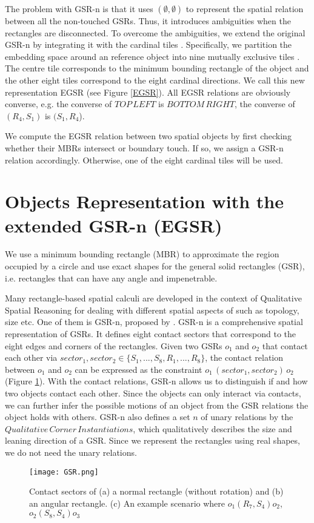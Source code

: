 \documentclass[letterpaper]{article}
\begin{document}
The problem with GSR-n is that it uses $(\emptyset, \emptyset)$ to represent the spatial relation between all the non-touched GSRs. Thus, it introduces ambiguities when the rectangles are disconnected. To overcome the ambiguities, we extend the original GSR-n by integrating it with the cardinal tiles \cite{goyal1997direction}. Specifically, we partition the embedding space around an reference object into nine mutually exclusive tiles . The centre tile corresponds to the minimum bounding rectangle of the object and the other eight tiles correspond to the eight cardinal directions. We call this new representation EGSR (see Figure \ref{EGSR}). All EGSR relations are obviously converse, e.g. the converse of $TOP\,LEFT$ is $BOTTOM\,RIGHT$, the converse of $(R_4, S_1)$ is $(S_1,R_4$).

We compute the EGSR relation between two spatial objects by first checking whether their MBRs intersect or boundary touch. If so, we assign a GSR-n relation accordingly. Otherwise, one of the eight cardinal tiles will be used. 

\section{Objects Representation with the extended GSR-n (EGSR)} 

We use a minimum bounding rectangle (MBR) to approximate the region occupied by a circle and use exact shapes for the general solid rectangles (GSR), i.e. rectangles that can have any angle and impenetrable. 

Many rectangle-based spatial calculi \cite{balbiani1998model,cohn2012thinking,sokeh2013efficient} are developed in the context of Qualitative Spatial Reasoning for dealing with different spatial aspects of such as topology, size etc. One of them is GSR-n, proposed by \cite{Ge2013}. GSR-n is a comprehensive spatial representation of GSRs. It defines eight contact sectors that correspond to the eight edges and corners of the rectangles. Given two GSRs $o_1$ and $o_2$ that contact each other via $sector_1, sector_2 \in \{S_1, ..., S_8, R_1, ..., R_8\}$, the contact relation between $o_1$ and $o_2$ can be expressed as the constraint $o_1 \, (sector_1, sector_2) \, o_2$ (Figure \ref{GSR}). With the contact relations, GSR-n allows us to distinguish if and how two objects contact each other. Since the objects can only interact via contacts, we can further infer the possible motions of an object from the GSR relations the object holds with others. GSR-n also defines a set $n$ of unary relations by the $Qualitative\,Corner\,Instantiations$, which qualitatively describes the size and leaning direction of a GSR. Since we represent the rectangles using real shapes, we do not need the unary relations. 
\begin{figure}[h!]
\centering\texttt{[image: GSR.png]}\caption{Contact sectors of (a) a normal rectangle (without rotation) and (b) an angular rectangle. (c) An example scenario where $o_1 (R_7, S_4) o_2$, $o_2 (S_8, S_4) o_3$}
\label{GSR}
\end{figure}
\end{document}
